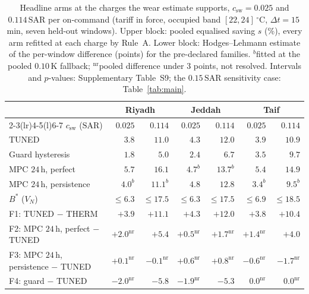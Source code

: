 \documentclass[pdflatex,sn-mathphys-num,iicol]{sn-jnl}
\theoremstyle{thmstyleone}\newtheorem{proposition}{Proposition}\newtheorem{corollary}{Corollary}
\theoremstyle{thmstyletwo}\newtheorem{remark}{Remark}\newtheorem{observation}{Observation}
\theoremstyle{thmstylethree}\newtheorem{definition}{Definition}
\newcommand{\csw}{c_{\mathrm{sw}}}
\newcommand{\SAR}{\text{SAR}}
\begin{document}
\begin{table}[t]
\centering
\caption{Headline arms at the charges the wear estimate supports, $\csw=0.025$ and $0.114\,\SAR$ per on-command (tariff in force, occupied band $[22,24]\,^\circ$C, $\Delta t=15\,$min, seven held-out windows). Upper block: pooled equalised saving $s$ (\%), every arm refitted at each charge by Rule~A. Lower block: Hodges--Lehmann estimate of the per-window difference (points) for the pre-declared families. $^{b}$fitted at the pooled $0.10\,$K fallback; $^{\mathrm{nr}}$pooled difference under $3$ points, not resolved. Intervals and $p$-values: Supplementary Table~S9; the $0.15\,\SAR$ sensitivity case: Table~\ref{tab:main}.}
\label{tab:derived}
\small
\begin{tabular*}{\textwidth}{@{\extracolsep{\fill}}lrrrrrr@{}}
\toprule
 & \multicolumn{2}{c}{Riyadh} & \multicolumn{2}{c}{Jeddah} & \multicolumn{2}{c}{Taif} \\
\cmidrule(lr){2-3}\cmidrule(lr){4-5}\cmidrule(l){6-7}
$\csw$ ($\SAR$) & $0.025$ & $0.114$ & $0.025$ & $0.114$ & $0.025$ & $0.114$ \\
\midrule
TUNED & $3.8$ & $11.0$ & $4.3$ & $12.0$ & $3.9$ & $10.9$ \\
Guard hysteresis & $1.8$ & $5.0$ & $2.4$ & $6.7$ & $3.5$ & $9.7$ \\
MPC $24\,$h, perfect & $5.7$ & $16.1$ & $4.7^{b}$ & $13.7^{b}$ & $5.4$ & $14.9$ \\
MPC $24\,$h, persistence & $4.0^{b}$ & $11.1^{b}$ & $4.8$ & $12.8$ & $3.4^{b}$ & $9.5^{b}$ \\
$B^{\ast}$ ($V_N$) & $\le6.3$ & $\le17.5$ & $\le6.3$ & $\le17.5$ & $\le6.9$ & $\le18.5$ \\
\midrule
F1: TUNED $-$ THERM & $+3.9$ & $+11.1$ & $+4.3$ & $+12.0$ & $+3.8$ & $+10.4$ \\
F2: MPC $24\,$h, perfect $-$ TUNED & $+2.0^{\mathrm{nr}}$ & $+5.4$ & $+0.5^{\mathrm{nr}}$ & $+1.7^{\mathrm{nr}}$ & $+1.4^{\mathrm{nr}}$ & $+4.0$ \\
F3: MPC $24\,$h, persistence $-$ TUNED & $+0.1^{\mathrm{nr}}$ & $-0.1^{\mathrm{nr}}$ & $+0.6^{\mathrm{nr}}$ & $+0.8^{\mathrm{nr}}$ & $-0.6^{\mathrm{nr}}$ & $-1.7^{\mathrm{nr}}$ \\
F4: guard $-$ TUNED & $-2.0^{\mathrm{nr}}$ & $-5.8$ & $-1.9^{\mathrm{nr}}$ & $-5.3$ & $0.0^{\mathrm{nr}}$ & $0.0^{\mathrm{nr}}$ \\
\bottomrule
\end{tabular*}
\end{table}
\end{document}
